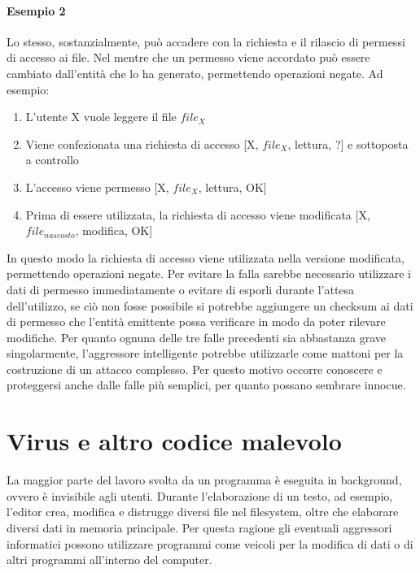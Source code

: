 \paragraph{Esempio 2}
Lo stesso, sostanzialmente, può accadere con la richiesta e il rilascio di permessi di accesso ai file. Nel mentre che un permesso viene accordato può essere cambiato dall'entità che lo ha generato, permettendo operazioni negate. Ad esempio:
\begin{enumerate}
\item L'utente X vuole leggere il file $file_X$
\item Viene confezionata una richiesta di accesso [X, $file_X$, lettura, ?] e sottoposta a controllo
\item L'accesso viene permesso [X, $file_X$, lettura, OK]
\item Prima di essere utilizzata, la richiesta di accesso viene modificata [X, $file_{nascosto}$, modifica, OK]
\end{enumerate}
In questo modo la richiesta di accesso viene utilizzata nella versione modificata, permettendo operazioni negate.
\newline \newline
Per evitare la falla sarebbe necessario utilizzare i dati di permesso immediatamente o evitare di esporli durante l'attesa dell'utilizzo, se ciò non fosse possibile si potrebbe aggiungere un checksum ai dati di permesso che l'entità emittente possa verificare in modo da poter rilevare modifiche. 
\newline \newline
Per quanto ognuna delle tre falle precedenti sia abbastanza grave singolarmente, l'aggressore intelligente potrebbe utilizzarle come mattoni per la costruzione di un attacco complesso. Per questo motivo occorre conoscere e proteggersi anche dalle falle più semplici, per quanto possano sembrare innocue.

\section{Virus e altro codice malevolo}
La maggior parte del lavoro svolta da un programma è eseguita in background, ovvero è invisibile agli utenti. Durante l'elaborazione di un testo, ad esempio, l'editor crea, modifica e distrugge diversi file nel filesystem, oltre che elaborare diversi dati in memoria principale. Per questa ragione gli eventuali aggressori informatici possono utilizzare programmi come veicoli per la modifica di dati o di altri programmi all'interno del computer.

